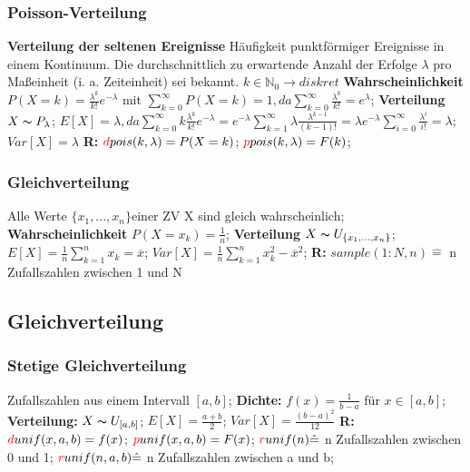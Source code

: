 \subsubsection{Poisson-Verteilung}
\textbf{Verteilung der seltenen Ereignisse} Häufigkeit punktförmiger Ereignisse in einem Kontinuum. Die durchschnittlich zu erwartende Anzahl der Erfolge $\lambda$ pro Maßeinheit (i. a. Zeiteinheit) sei bekannt. $k \in \mathbb{N}_{0} \rightarrow diskret$
\textbf{Wahrscheinlichkeit}$P (X = k) = \frac{\lambda^k}{k!}e^{-\lambda}$ mit $ \sum_{k=0}^{\infty} P(X=k) = 1, da \sum_{k=0}^{\infty} \frac{\lambda^k}{k!} = e^{\lambda}$; 
\textbf{Verteilung} $X \thicksim P_{\lambda}$; 
$E[X] = \lambda, da \sum_{k=0}^{\infty} k\frac{\lambda^k}{k!} e^{-\lambda} = e^{-\lambda}\sum_{k=1}^{\infty}\lambda \frac{\lambda^{k-1}}{(k-1)!} = \lambda e^{-\lambda} \sum_{i=0}^{\infty} \frac{\lambda^i}{i!} = \lambda$; 
$Var[X] = \lambda$ 
\textbf{R:} 
$\textcolor{red}{d}pois(k,\lambda)=P(X=k)$; 
$\textcolor{red}{p}pois(k,\lambda)=F(k)$; 
\subsubsection{Gleichverteilung}
Alle Werte $\{x_{1},...,x_{n}\}$einer ZV X sind gleich wahrscheinlich; 
\textbf{Wahrscheinlichkeit} 
$P(X=x_{k}) = \frac{1}{n}$; 
\textbf{Verteilung} 
$X \thicksim U_{\{x_{1}, ..., x_{n}\}}$; 
$E[X] = \frac{1}{n} \sum_{k=1}^{n} x_{k} = \overline{x}$; 
$Var[X] = \frac{1}{n} \sum_{k=1}^{n} x_{k}^2 - \overline{x}^2$; 
\textbf{R:} 
$sample(1:N,n) \hat{=}$ n Zufallszahlen zwischen 1 und N
\subsection{Gleichverteilung}
\subsubsection{Stetige Gleichverteilung}
Zufallszahlen aus einem Intervall $[a,b]$; 
\textbf{Dichte:} 
$f(x) = \frac{1}{b-a}$ für $x \in [a,b]$; 
\textbf{Verteilung:} 
$X \thicksim U_{[a,b]}$; 
$E[X] = \frac{a+b}{2}$; 
$Var[X] = \frac{(b-a)^2}{12}$
\textbf{R:} 
$\textcolor{red}{d}unif(x,a,b)=f(x)$; 
$\textcolor{red}{p}unif(x,a,b)=F(x)$; 
$\textcolor{red}{r}unif(n) \hat{=}$ n Zufallszahlen zwischen 0 und 1; 
$\textcolor{red}{r}unif(n, a, b) \hat{=}$ n Zufallszahlen zwischen a und b; 

